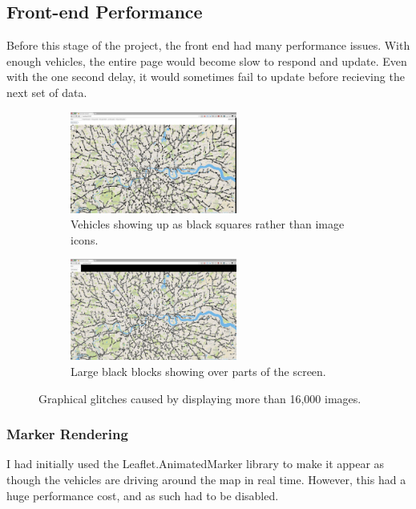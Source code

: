 \documentclass[ %
                    author={Alexander Hill},
                supervisor={Dr. Benjamin Sach},
                    degree={MEng},
                     title={MARMOSET},
                  subtitle={Multi-Agent Route Management using Online Simulation for Efficient Transportation},
                      type={research},
                      year={2016} ]{dissertation}
\begin{document}
\subsection{Front-end Performance}

Before this stage of the project, the front end had many performance issues.
With enough vehicles, the entire page would become slow to respond and update.
Even with the one second delay, it would sometimes fail to update before
recieving the next set of data.

\begin{figure}[h]
\centering
\begin{subfigure}[b]{0.4\textwidth}
    \centering
    \includegraphics[height=9em]{glitches-car}
    \caption{Vehicles showing up as black squares rather than image icons.}\label{fig:glitches-car}
\end{subfigure}
\hspace{3em}
\begin{subfigure}[b]{0.4\textwidth}
    \centering
    \includegraphics[height=9em]{glitches-chrome}
    \caption{Large black blocks showing over parts of the screen.}\label{fig:glitches-chrome}
\end{subfigure}
\caption{Graphical glitches caused by displaying more than 16,000 images.}
\end{figure}

\subsubsection{Marker Rendering}

I had initially used the Leaflet.AnimatedMarker library to make it appear as
though the vehicles are driving around the map in real time. However, this had a
huge performance cost, and as such had to be disabled.
\end{document}
